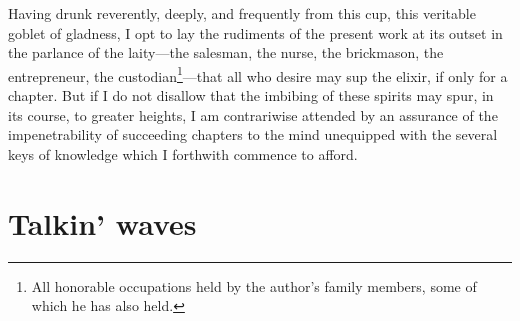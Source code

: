 Having drunk reverently, deeply, and frequently from this cup, this
veritable goblet of gladness, I opt to lay the rudiments of the
present work at its outset in the parlance of the laity---the
salesman, the nurse, the brickmason, the entrepreneur, the
custodian\footnote{All honorable occupations held by the author's
  family members, some of which he has also held.}---that all who
desire may sup the elixir, if only for a chapter. But if I do not
disallow that the imbibing of these spirits may spur, in its course,
to greater heights, I am contrariwise attended by an assurance of the
impenetrability of succeeding chapters to the mind unequipped with the
several keys of knowledge which I forthwith commence to afford.

\section{Talkin' waves}














